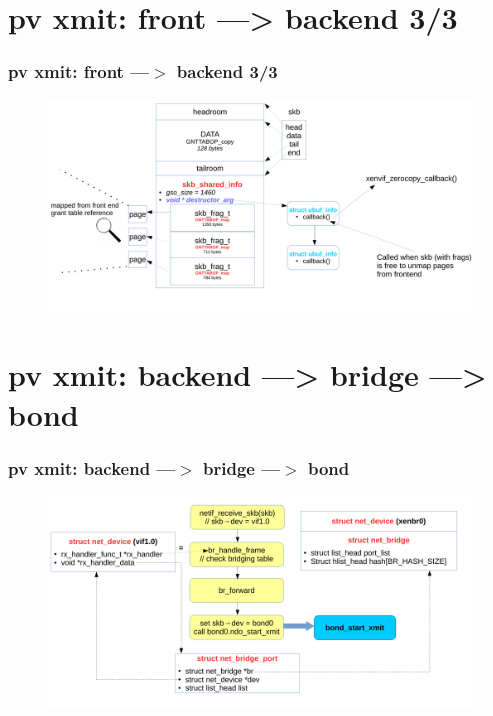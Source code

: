 \documentclass[aspectratio=169]{beamer}
\begin{document}
\section{pv xmit: front ---> backend 3/3}
\begin{frame}
\frametitle{pv xmit: front ---$>$ backend 3/3}
\begin{figure}
\includegraphics[width=1.0\linewidth]{figures/skb_destruct.pdf}
\end{figure}
\end{frame}



\section{pv xmit: backend ---> bridge ---> bond}
\begin{frame}
\frametitle{pv xmit: backend ---$>$ bridge ---$>$ bond}
\begin{figure}
\includegraphics[width=1.0\linewidth]{figures/vif_to_bridge.pdf}
\end{figure}
\end{frame}

\end{document}
